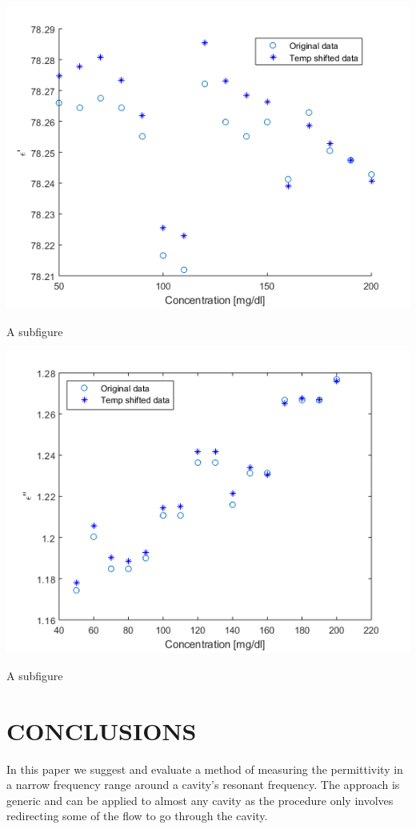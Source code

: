 \documentclass[10pt,final,conference,a4paper,twocolumn]{IEEEtran_AntennEMB_GigaHertz2016}
\begin{document}
\begin{subfigures}
	\raggedleft
	\includegraphics[width=.50\linewidth]{pumpgluzoomERE.png}
	\caption{A subfigure}
	\label{fig:sub1}
\end{subfigures}
\begin{subfigures}
	\raggedright
	\includegraphics[width=.50\linewidth]{pumpgluzoomEIM.png}
	\caption{A subfigure}
	\label{fig:sub2}
\end{subfigures}







\section{CONCLUSIONS}
In this paper we suggest and evaluate a method of measuring the permittivity in a narrow frequency range around a cavity's resonant frequency. The approach is generic and can be applied to almost any cavity as the procedure only involves redirecting some of the flow to go through the cavity.
\end{document}
